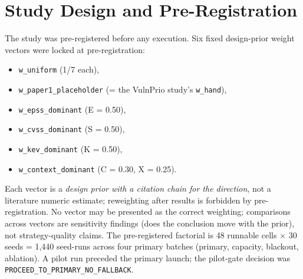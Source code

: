 \section{Study Design and Pre-Registration}
The study was pre-registered before any execution. Six fixed design-prior weight vectors were locked at pre-registration:

\begin{itemize}
\item \texttt{w\_uniform} (1/7 each),
\item \texttt{w\_paper1\_placeholder} (= the VulnPrio study's \texttt{w\_hand}),
\item \texttt{w\_epss\_dominant} (E = 0.50),
\item \texttt{w\_cvss\_dominant} (S = 0.50),
\item \texttt{w\_kev\_dominant} (K = 0.50),
\item \texttt{w\_context\_dominant} (C = 0.30, X = 0.25).
\end{itemize}

Each vector is a \emph{design prior with a citation chain for the direction}, not a literature numeric estimate; reweighting after results is forbidden by pre-registration. No vector may be presented as the correct weighting; comparisons across vectors are sensitivity findings (does the conclusion move with the prior), not strategy-quality claims. The pre-registered factorial is 48 runnable cells $\times$ 30 seeds = 1,440 seed-runs across four primary batches (primary, capacity, blackout, ablation). A pilot run preceded the primary launch; the pilot-gate decision was \texttt{PROCEED\_TO\_PRIMARY\_NO\_FALLBACK}.
